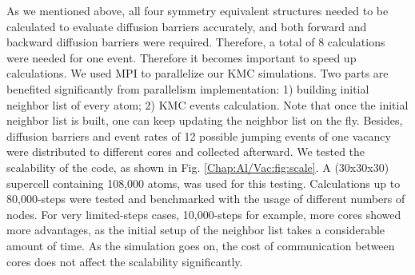 As we mentioned above, all four symmetry equivalent structures needed to be calculated to evaluate diffusion barriers accurately, and both forward and backward diffusion barriers were required. Therefore, a total of 8 calculations were needed for one event. Therefore it becomes important to speed up calculations. We used \ac{MPI} to parallelize our \ac{KMC} simulations. Two parts are benefited significantly from parallelism implementation: 1) building initial neighbor list of every atom; 2) \ac{KMC} events calculation. Note that once the initial neighbor list is built, one can keep updating the neighbor list on the fly. Besides, diffusion barriers and event rates of 12 possible jumping events of one vacancy were distributed to different cores and collected afterward. We tested the scalability of the code, as shown in Fig. \ref{Chap:Al/Vac:fig:scale}. A (30x30x30) supercell containing 108,000 atoms, was used for this testing. Calculations up to 80,000-steps were tested and benchmarked with the usage of different numbers of nodes. For very limited-steps cases, 10,000-steps for example, more cores showed more advantages, as the initial setup of the neighbor list takes a considerable amount of time. As the simulation goes on, the cost of communication between cores does not affect the scalability significantly.
